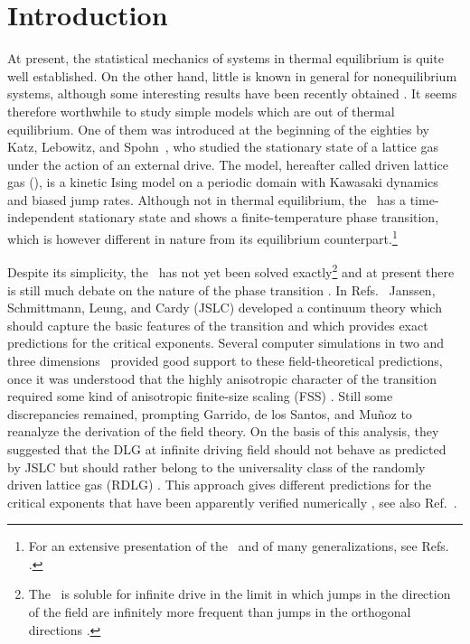 \documentclass[12pt]{article}
\begin{document}
\section{Introduction}

At present, the statistical mechanics of systems in thermal equilibrium is 
quite well established. On the other hand, little is known in general
for nonequilibrium systems, although some interesting results have been
recently obtained \cite{ref-generali}. 
It seems therefore worthwhile to 
study simple models which are out of thermal equilibrium. 
One of them was introduced
at the beginning of the eighties by 
Katz, Lebowitz, and Spohn~\cite{Katz}, who studied the 
stationary state of a lattice gas under the action of an external
drive. The model, hereafter called driven lattice gas (\dlg), is
a kinetic Ising model on a periodic domain with Kawasaki dynamics and
biased jump rates. Although not in thermal equilibrium, the \dlg\
has a time-independent stationary state and shows a finite-temperature 
phase transition, which is however different in nature from its
equilibrium counterpart.\footnote{For an extensive presentation of the \dlg\
and of many generalizations, see Refs. \cite{Schmittmann95,MarroDickman}.}

Despite its simplicity, the \dlg\  has not yet been solved exactly\footnote{
The \dlg\ is soluble for infinite drive in the limit in which jumps 
in the direction of the field are infinitely more frequent than 
jumps in the orthogonal directions \cite{vB-S-84}.}
and at present there is still much debate on the nature of the phase
transition \cite{Janssen86a,Leung86,Garrido98,Garrido99,Garrido00,Viability99,%
leung00}.  In Refs.~\cite{Janssen86a,Leung86}
Janssen, Schmittmann, Leung, and Cardy (JSLC)  
developed a continuum theory which should  
capture the basic features of the transition and which provides 
exact predictions for the critical exponents.
Several computer simulations in two 
and three dimensions~\cite{Zhang88,Leung92,Wang96,Leung99}
provided good support to these field-theoretical predictions, once it was
understood that the highly anisotropic character of the transition
required some kind of anisotropic finite-size scaling (FSS) 
\cite{Binder89,Leung92}. 
Still some discrepancies remained, prompting Garrido, de los Santos,
and Mu\~{n}oz \cite{Garrido98,Garrido99,Garrido00}
to reanalyze the derivation of the field theory. 
On the basis of this analysis, they suggested that the DLG at 
infinite driving field should not behave as predicted by JSLC 
but should rather belong to the universality class of the randomly driven
lattice gas (RDLG) \cite{SZ-91,Schmittmann-93}. This approach gives different 
predictions for the critical exponents that have been apparently
verified numerically \cite{AGMM,AS-02}, see also Ref.~\cite{Munoz-02}. 
\end{document}
